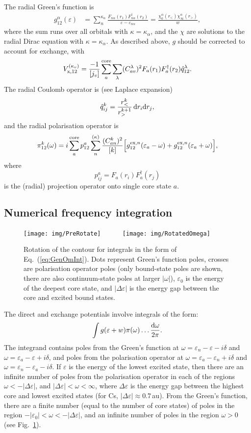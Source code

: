 \documentclass[10pt,twocolumn,a4paper]{article}%
\newcommand{\be}{\begin{equation}}
\newcommand{\ee}{\end{equation}}
\def\d{\ensuremath{{\rm d}}}
\def\en{\ensuremath{\varepsilon}}
\renewcommand{\a}{\ensuremath{\alpha}}
\renewcommand{\k}{\ensuremath{\kappa}}
\newcommand{\w}{\ensuremath{\omega}}
\begin{document}
The radial Green's function is
\begin{align}\label{eq:RadialGreen}
g^\a_{12}(\en) &= \sum_n^{\k_\a} \frac{F_{n\a}(r_1)F^\dag_{n\a}(r_2)}{\en-\en_{n\a}}
= \frac{\chi_0^\a(r_<)\chi_\infty^\a(r_>)}{w},
\end{align}
where the sum runs over all orbitals with $\k=\k_\a$, and the $\chi$ are solutions to the radial Dirac equation with $\k=\k_\a$.
As described above, $g$ should be corrected to account for exchange, with
\be\label{eq:RadialVx}
V_{\rm x,12}^{(\k_v)} = \frac{-1}{[j_v]}\sum_a^{\rm core}\sum_\lambda (C^\lambda_{av})^2F_a(r_1)F_a^\dag(r_2)\hat q^\lambda_{12}.
\ee
The radial Coulomb operator is (see Laplace expansion)
\be\label{eq:RadialQ}
\hat q^k_{ij} = \frac{r_<^k}{r_>^{k+1}} \, \d r_i\d r_j,
\ee
and the radial polarisation operator is
\begin{multline}\label{eq:RadialPolarisation}
\pi_{12}^{k}(\w) = i\sum_{a}^{\rm core}p^a_{12}\sum_{n}^{(\kappa)} \frac{(C^k_{an})^2}{[k]}
\Big[g_{12}^{{\rm ex},n}(\en_{a}-\w)
+g_{12}^{{\rm ex},n}(\en_{a}+\w)
\Big],
\end{multline}
where
\[
p^a_{ij} = F_a(r_i)F^\dag_a(r_j)
\]
is the (radial) projection operator onto single core state $a$.



\subsection{Numerical frequency integration}


\begin{figure}%
\centering%
\texttt{[image: img/PreRotate]}~~
\raisebox{14\height}{${\to}$}~~~
\texttt{[image: img/RotatedOmega]}%
\caption{\small Rotation of the contour for integrals in the form of Eq.~(\ref{eq:GenOmInt}).
Dots represent Green's function poles, crosses are polarisation operator poles (only bound-state poles are shown, there are also continuum-state poles at larger $|\w|$),
$\en_0$ is the energy of the deepest core state, and $|\Delta\en|$ is the energy gap between the core and excited bound states.
\label{fig:contourRotate}}
\end{figure}


The direct and exchange potentials involve integrals of the form:
\be\label{eq:GenOmInt}
\int g(\en+w)\pi(\w)\ldots \frac{\d\w}{2\pi}.
\ee
The integrand contains poles from the Green's function at
$\w=\en_n-\en-i\delta$ and $\w=\en_a-\en+i\delta$,
and poles from the polarisation operator at
$\w=\en_a-\en_n+i\delta$ and $\w=\en_n-\en_a-i\delta$.
If $\en$ is the energy of the lowest excited state, then
there are an infinite number of poles from the polarisation operator in each of the regions $\w<-|\Delta\en|$, and $|\Delta\en|<\w<\infty$,
where $\Delta\en$ is the energy gap between the highest core and lowest excited states (for Cs, $|\Delta\en|\approx0.7$\,au).
From the Green's function, there are a finite number (equal to the number of core states) of poles in the region
$-|\en_0|<\w<-|\Delta\en|$, and an infinite number of poles in the region $\w>0$ (see Fig.~\ref{fig:contourRotate}).
\end{document}
